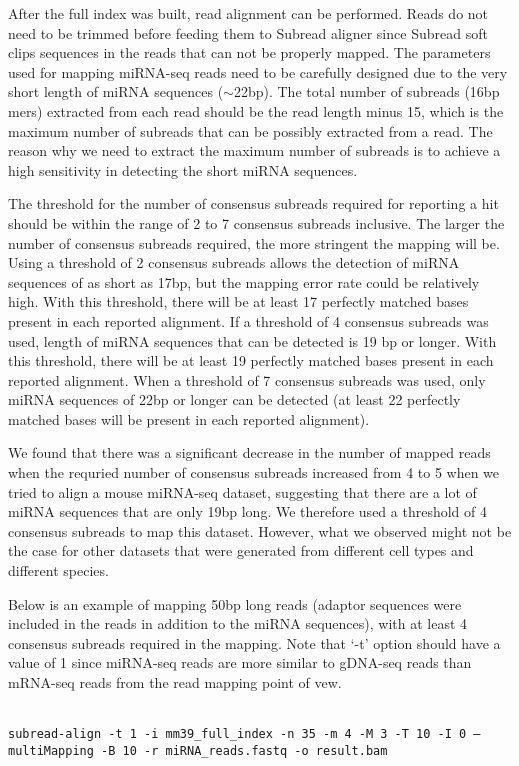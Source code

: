 \documentclass[12pt]{report}
\newcommand{\code}[1]{{\small\texttt{#1}}}
\newcommand{\Subread}{\textsf{Subread}}
\begin{document}
After the full index was built, read alignment can be performed.
Reads do not need to be trimmed before feeding them to {\Subread} aligner since {\Subread} soft clips sequences in the reads that can not be properly mapped.
The parameters used for mapping miRNA-seq reads need to be carefully designed due to the very short length of miRNA sequences ($\sim$22bp).
The total number of subreads (16bp mers) extracted from each read should be the read length minus 15, which
is the maximum number of subreads that can be possibly extracted from a read.
The reason why we need to extract the maximum number of subreads is to achieve a high sensitivity in detecting the short miRNA sequences.

The threshold for the number of consensus subreads required for reporting a hit should be within the range of 2 to 7 consensus subreads inclusive.
The larger the number of consensus subreads required, the more stringent the mapping will be.
Using a threshold of 2 consensus subreads allows the detection of miRNA sequences of as short as 17bp, but the mapping error rate could be relatively high.
With this threshold, there will be at least 17 perfectly matched bases present in each reported alignment.
If a threshold of 4 consensus subreads was used, length of miRNA sequences that can be detected is 19 bp or longer.
With this threshold, there will be at least 19 perfectly matched bases present in each reported alignment.
When a threshold of 7 consensus subreads was used, only miRNA sequences of 22bp or longer can be detected (at least 22 perfectly matched bases will be present in each reported alignment).

We found that there was a significant decrease in the number of mapped reads when the requried number of consensus subreads increased from 4 to 5 when we tried to align a mouse miRNA-seq dataset, suggesting that there are a lot of miRNA sequences that are only 19bp long.
We therefore used a threshold of 4 consensus subreads to map this dataset.
However, what we observed might not be the case for other datasets that were generated from different cell types and different species.

Below is an example of mapping 50bp long reads (adaptor sequences were included in the reads in addition to the miRNA sequences), with at least 4 consensus subreads required in the mapping.
Note that `-t' option should have a value of 1 since miRNA-seq reads are more similar to gDNA-seq reads than mRNA-seq reads from the read mapping point of vew.

\code{\\
subread-align -t 1 -i mm39\_full\_index -n 35 -m 4 -M 3 -T 10 -I 0
--multiMapping -B 10 -r miRNA\_reads.fastq -o result.bam\\
}
\end{document}
